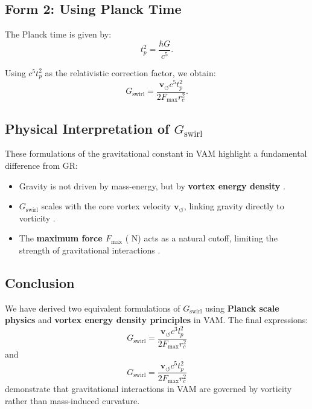 \documentclass[preprint]{revtex4-2}
\begin{document}
    \subsection*{Form 2: Using Planck Time}
    The Planck time is given by:
    \begin{equation*}
        t_p^2 = \frac{\hbar G}{c^5}.
    \end{equation*}

    Using \( c^5 t_p^2 \) as the relativistic correction factor, we obtain:
    \begin{equation*}
        G_\text{swirl} = \frac{\mathbf{v}_{\scriptscriptstyle\boldsymbol{\circlearrowleft}} c^5 t_p^2}{2 F_{\max} r_c^2}.
    \end{equation*}

    \subsection*{Physical Interpretation of \(  G_\text{swirl} \)}
    These formulations of the gravitational constant in VAM highlight a fundamental difference from GR:
    \begin{itemize}
        \item Gravity is not driven by mass-energy, but by \textbf{vortex energy density} \cite{barcelo_superfluid}.
        \item \(  G_\text{swirl} \) scales with the core vortex velocity \( \mathbf{v}_{\scriptscriptstyle\boldsymbol{\circlearrowleft}} \), linking gravity directly to vorticity \cite{moffatt_helicity}.
        \item The \textbf{maximum force \( F_{\max} \)} ( N) acts as a natural cutoff, limiting the strength of gravitational interactions \cite{schiller_max_force}.
    \end{itemize}

    \subsection*{Conclusion}
    We have derived two equivalent formulations of \(  G_\text{swirl} \) using \textbf{Planck scale physics} and \textbf{vortex energy density principles} in VAM. The final expressions:
    \begin{equation*}
        G_\text{swirl} = \frac{\mathbf{v}_{\scriptscriptstyle\boldsymbol{\circlearrowleft}} c^3 l_p^2}{2 F_{\max} r_c^2}
    \end{equation*}
    and
    \begin{equation*}
        G_\text{swirl} = \frac{\mathbf{v}_{\scriptscriptstyle\boldsymbol{\circlearrowleft}} c^5 t_p^2}{2 F_{\max} r_c^2}
    \end{equation*}
    demonstrate that gravitational interactions in VAM are governed by vorticity rather than mass-induced curvature.
\end{document}

